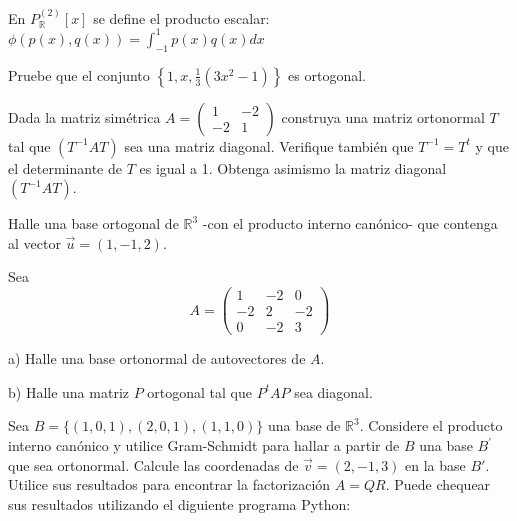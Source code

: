 {\begin{exercise}
\bigskip

\item
En $P^{(2)}_{\mathbb{R}}\left[x\right]$ se define el producto escalar:
$\phi(p(x),q(x))= \int_{-1}^1p(x)q(x)dx$

\noindent Pruebe que el conjunto $\left\{1,x, \frac{1}{3}(3x^2 -1)\right\}$ es ortogonal.
\end{exercise}

\begin{exercise}
\item

Dada la matriz simétrica 
$A=\left(\begin{array}{cc}1 & -2 \\-2 & 1
\end{array}
 \right)$
 construya una matriz ortonormal $T$ tal que $(T^{-1}AT)$ sea una matriz diagonal. Verifique
 también que  $T^{-1}=T^{t}$ y que el determinante de $T$ es igual a 1. Obtenga asimismo la matriz
 diagonal $(T^{-1}AT)$.
\end{exercise}


\begin{exercise}
\item

Halle una base ortogonal de $\mathbb{R}^3$ -con el producto interno canónico- que contenga al vector $\vec{u}=(1,-1,2)$.
\end{exercise}
\begin{exercise}
\item
Sea 
\[A=\left(\begin{array}{ccc}1 & -2 & 0   \\ -2& 2 & -2
\\ 0  & -2 & 3                         
\end{array}
 \right)
\]

a) Halle una base ortonormal de autovectores de $A$.

b) Halle una matriz $P$ ortogonal tal que $P^tAP$ sea diagonal.
\end{exercise}
\begin{exercise}
\item


Sea $B=\{(1,0,1),(2,0,1),(1,1,0)\}$ una base de $\mathbb{R}^3$. Considere el producto interno canónico y utilice Gram-Schmidt para hallar a partir de $B$ una base $B^{\prime}$ que sea ortonormal. Calcule las coordenadas de $\vec{v}=(2,-1,3)$ en la base $B\prime$. Utilice sus resultados para encontrar la factorización $A=QR$.  Puede chequear sus resultados utilizando el diguiente programa Python:


\end{exercise}}
